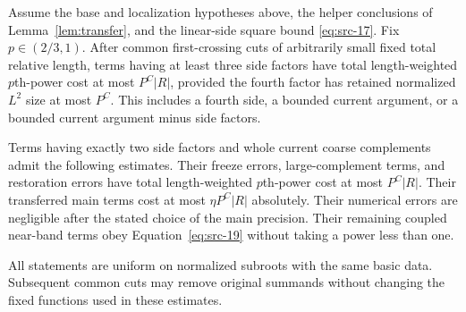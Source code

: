 \begin{proposition}\label{prop:side-estimate}
Assume the base and localization hypotheses above, the helper
conclusions of Lemma~\ref{lem:transfer}, and the linear-side square
bound \eqref{eq:src-17}.  Fix $p\in(2/3,1)$.  After common
first-crossing cuts of arbitrarily small fixed total relative
length, terms having at least three side factors have total
length-weighted $p$th-power cost at most $P^C|R|$, provided the
fourth factor has retained normalized $L^2$ size at most $P^C$.
This includes a fourth side, a bounded current argument, or a
bounded current argument minus side factors.

Terms having exactly two side factors and whole current coarse
complements admit the following estimates.  Their freeze errors,
large-complement terms, and restoration errors have total
length-weighted $p$th-power cost at most $P^C|R|$.  Their transferred
main terms cost at most $\eta P^C|R|$ absolutely.  Their numerical
errors are negligible after the stated choice of the main
precision.  Their remaining coupled near-band terms obey
Equation~\eqref{eq:src-19} without taking a power less than one.

All statements are uniform on normalized subroots with the same
basic data.  Subsequent common cuts may remove original summands
without changing the fixed functions used in these estimates.
\end{proposition}

